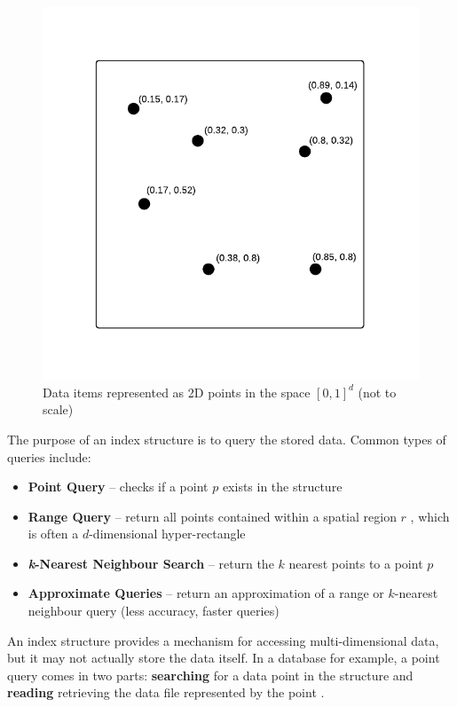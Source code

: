 \begin{figure}
	\vspace{-40pt}
	\begin{center}
		\includegraphics[scale=0.6]{figures/2D_data_space.pdf}
	\end{center}
	\vspace{-40pt}
	\caption{Data items represented as 2D points in the space $[0, 1]^d$ (not to scale)}
	\label{fig:data-space}
\end{figure}

The purpose of an index structure is to query the stored data. Common types of queries include:
\begin{itemize}
	\item \textbf{Point Query} -- checks if a point $p$ exists in the structure \cite{rplus-tree}
	\item \textbf{Range Query} -- return all points contained within a spatial region $r$ \cite{rplus-tree}, which is often a $d$-dimensional hyper-rectangle \cite{r-tree, pk-tree, pyramid-tree}
	\item \textbf{\textit{k}-Nearest Neighbour Search} -- return the $k$ nearest points to a point $p$ \cite{pk-tree}
	\item \textbf{Approximate Queries} -- return an approximation of a range or $k$-nearest neighbour query (less accuracy, faster queries) \cite{splay-quadtree} 
\end{itemize}

An index structure provides a mechanism for accessing multi-dimensional data, but it may not actually store the data itself. In a database for example, a point query comes in two parts: \textbf{searching} for a data point in the structure and \textbf{reading} retrieving the data file represented by the point \cite{rsr-tree}.
